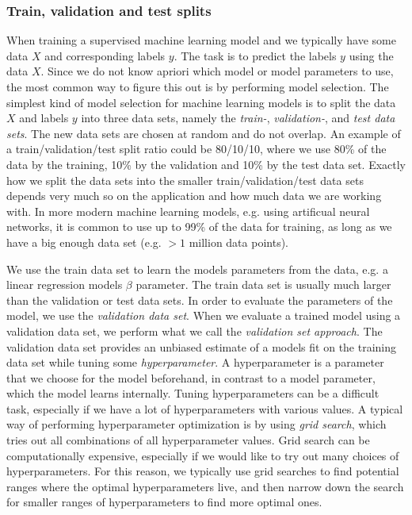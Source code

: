 \subsubsection{Train, validation and test splits}
\label{sec:train-val-test-splits}
When training a supervised machine learning model and  we typically have some data $X$ and corresponding labels $y$. The task is to predict the labels $y$ using the data $X$. Since we do not know apriori which model or model parameters to use, the most common way to figure this out is by performing model selection. The simplest kind of model selection for machine learning models is to split the data $X$ and labels $y$ into three data sets, namely the \textit{train-}, \textit{validation-}, and \textit{test data sets}. The new data sets are chosen at random and do not overlap. An example of a train/validation/test split ratio could be 80/10/10, where we use 80\% of the data by the training, 10\% by the validation and 10\% by the test data set. Exactly how we split the data sets into the smaller train/validation/test data sets depends very much so on the application and how much data we are working with. In more modern machine learning models, e.g. using artificual neural networks, it is common to use up to 99\% of the data for training, as long as we have a big enough data set (e.g. $>1$ million data points).

We use the train data set to learn the models parameters from the data, e.g. a linear regression models $\beta$ parameter. The train data set is usually much larger than the validation or test data sets. In order to evaluate the parameters of the model, we use the \textit{validation data set}. When we evaluate a trained model using a validation data set, we perform what we call the \textit{validation set approach}. The validation data set provides an unbiased estimate of a models fit on the training data set while tuning some \textit{hyperparameter}. A hyperparameter is a parameter that we choose for the model beforehand, in contrast to a model parameter, which the model learns internally. Tuning hyperparameters can be a difficult task, especially if we have a lot of hyperparameters with various values. A typical way of performing hyperparameter optimization is by using \textit{grid search}, which tries out all combinations of all hyperparameter values. Grid search can be computationally expensive, especially if we would like to try out many choices of hyperparameters. For this reason, we typically use grid searches to find potential ranges where the optimal hyperparameters live, and then narrow down the search for smaller ranges of hyperparameters to find more optimal ones.

